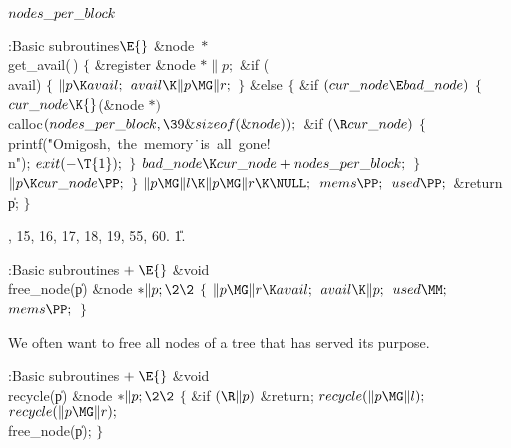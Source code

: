 \B\D$\\{nodes\_per\_block}$ \5
\par
\Y\B\4:Basic subroutines\X${}\E{}$\6
\&{node} ${}{*}{}$\\{get\_avail}(\,)\6
${}\{{}$\1\6
\&{register} \&{node} ${}{*}\|p;{}$\7
\&{if} (\\{avail})\5
${}\{{}$\1\6
${}\|p\K\\{avail};{}$\6
${}\\{avail}\K\|p\MG\|r;{}$\6
\4${}\}{}$\2\6
\&{else}\5
${}\{{}$\1\6
\&{if} ${}(\\{cur\_node}\E\\{bad\_node}){}$\5
${}\{{}$\1\6
${}\\{cur\_node}\K{}$(\&{node} ${}{*}){}$ \\{calloc}${}(\\{nodes\_per\_block},%
\39\&{sizeof}(\&{node}));{}$\6
\&{if} ${}(\R\\{cur\_node}){}$\5
${}\{{}$\1\6
\\{printf}(\.{"Omigosh,\ the\ memory}\)\.{\ is\ all\ gone!\\n"});\6
${}\\{exit}({-}\T{1});{}$\6
\4${}\}{}$\2\6
${}\\{bad\_node}\K\\{cur\_node}+\\{nodes\_per\_block};{}$\6
\4${}\}{}$\2\6
${}\|p\K\\{cur\_node}\PP;{}$\6
\4${}\}{}$\2\6
${}\|p\MG\|l\K\|p\MG\|r\K\NULL;{}$\6
${}\\{mems}\PP;{}$\6
${}\\{used}\PP;{}$\6
\&{return} \|p;\6
\4${}\}{}$\2\par
{}, 15, 16, 17, 18, 19, 55, 60.
\U1.\fi

\B{}:Basic subroutines\X${}\mathrel+\E{}$\6
\&{void} \\{free\_node}(\|p)\1\1\6
\&{node} ${}{*}\|p;\2\2{}$\6
${}\{{}$\1\6
${}\|p\MG\|r\K\\{avail};{}$\6
${}\\{avail}\K\|p;{}$\6
${}\\{used}\MM;{}$\6
${}\\{mems}\PP;{}$\6
\4${}\}{}$\2\par
\fi

We often want to free all nodes of a tree that has served
its purpose.

\Y\B\4:Basic subroutines\X${}\mathrel+\E{}$\6
\&{void} \\{recycle}(\|p)\1\1\6
\&{node} ${}{*}\|p;\2\2{}$\6
${}\{{}$\1\6
\&{if} ${}(\R\|p){}$\1\5
\&{return};\2\6
${}\\{recycle}(\|p\MG\|l);{}$\6
${}\\{recycle}(\|p\MG\|r);{}$\6
\\{free\_node}(\|p);\6
\4${}\}{}$\2\par
\fi

